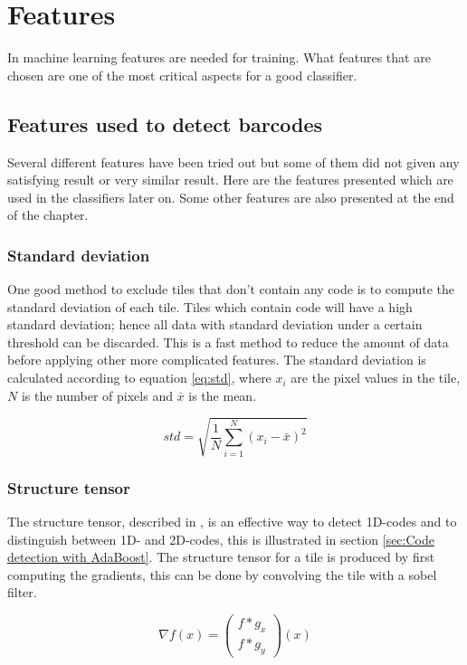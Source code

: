 
\chapter{Features}
\label{sec:Features}
In machine learning features are needed for training. What features that are chosen are one of the most critical aspects for a good classifier.
 
\section{Features used to detect barcodes}
\label{sec:Features used to detect barcodes}
Several different features have been tried out but some of them did not given any satisfying result or very similar result. Here are the features presented which are used in the classifiers later on. Some other features are also presented at the end of the chapter. 
\subsection{Standard deviation}
\label{sec:Standard deviation}
One good method to exclude tiles that don't contain any code is to compute the standard deviation of each tile. Tiles which contain code will have a high standard deviation; hence all data with standard deviation under a certain threshold can be discarded. This is a fast method to reduce the amount of data before applying other more complicated features. The standard deviation is calculated according to equation \ref{eq:std}, where $x_i$ are the pixel values in the tile, $N$ is the number of pixels and $\bar{x}$ is the mean.

\begin{equation}
	std = \sqrt{\frac{1}{N}\sum_{i=1}^{N} (x_i-\bar{x})^2}
\end{equation}
\label{eq:std}

\subsection{Structure tensor}
\label{sec:Structure tensor}
The structure tensor, described in \citep{Bigun:1987}, is an effective way to detect 1D-codes and to distinguish between 1D- and 2D-codes, this is illustrated in section \ref{sec:Code detection with AdaBoost}. The structure tensor for a tile is produced by first computing the gradients, this can be done by convolving the tile with a sobel filter. 

\begin{equation}
	\nabla f(x) = \begin{pmatrix} 
		f*g_x \\ f*g_y
	\end{pmatrix}(x)
\end{equation}

